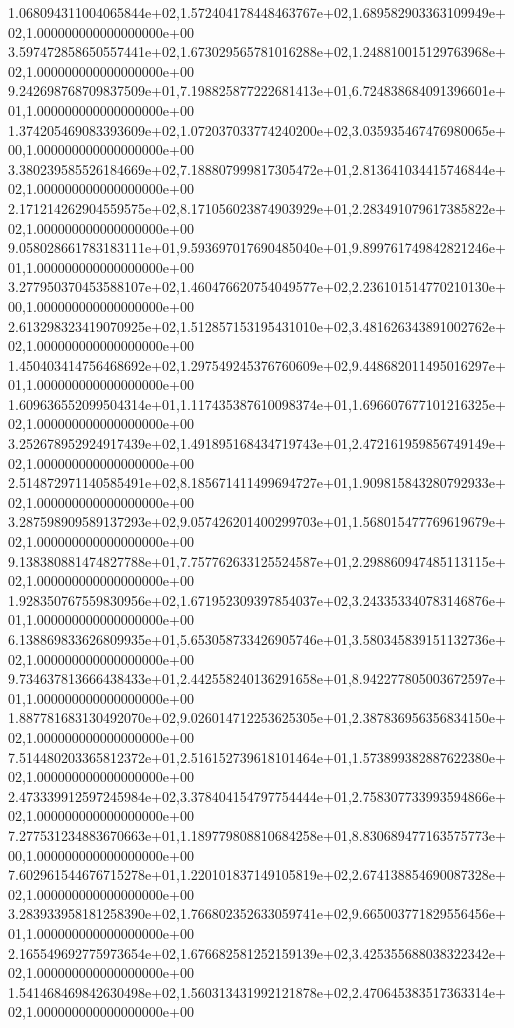 1.068094311004065844e+02,1.572404178448463767e+02,1.689582903363109949e+02,1.000000000000000000e+00
3.597472858650557441e+02,1.673029565781016288e+02,1.248810015129763968e+02,1.000000000000000000e+00
9.242698768709837509e+01,7.198825877222681413e+01,6.724838684091396601e+01,1.000000000000000000e+00
1.374205469083393609e+02,1.072037033774240200e+02,3.035935467476980065e+00,1.000000000000000000e+00
3.380239585526184669e+02,7.188807999817305472e+01,2.813641034415746844e+02,1.000000000000000000e+00
2.171214262904559575e+02,8.171056023874903929e+01,2.283491079617385822e+02,1.000000000000000000e+00
9.058028661783183111e+01,9.593697017690485040e+01,9.899761749842821246e+01,1.000000000000000000e+00
3.277950370453588107e+02,1.460476620754049577e+02,2.236101514770210130e+00,1.000000000000000000e+00
2.613298323419070925e+02,1.512857153195431010e+02,3.481626343891002762e+02,1.000000000000000000e+00
1.450403414756468692e+02,1.297549245376760609e+02,9.448682011495016297e+01,1.000000000000000000e+00
1.609636552099504314e+01,1.117435387610098374e+01,1.696607677101216325e+02,1.000000000000000000e+00
3.252678952924917439e+02,1.491895168434719743e+01,2.472161959856749149e+02,1.000000000000000000e+00
2.514872971140585491e+02,8.185671411499694727e+01,1.909815843280792933e+02,1.000000000000000000e+00
3.287598909589137293e+02,9.057426201400299703e+01,1.568015477769619679e+02,1.000000000000000000e+00
9.138380881474827788e+01,7.757762633125524587e+01,2.298860947485113115e+02,1.000000000000000000e+00
1.928350767559830956e+02,1.671952309397854037e+02,3.243353340783146876e+01,1.000000000000000000e+00
6.138869833626809935e+01,5.653058733426905746e+01,3.580345839151132736e+02,1.000000000000000000e+00
9.734637813666438433e+01,2.442558240136291658e+01,8.942277805003672597e+01,1.000000000000000000e+00
1.887781683130492070e+02,9.026014712253625305e+01,2.387836956356834150e+02,1.000000000000000000e+00
7.514480203365812372e+01,2.516152739618101464e+01,1.573899382887622380e+02,1.000000000000000000e+00
2.473339912597245984e+02,3.378404154797754444e+01,2.758307733993594866e+02,1.000000000000000000e+00
7.277531234883670663e+01,1.189779808810684258e+01,8.830689477163575773e+00,1.000000000000000000e+00
7.602961544676715278e+01,1.220101837149105819e+02,2.674138854690087328e+02,1.000000000000000000e+00
3.283933958181258390e+02,1.766802352633059741e+02,9.665003771829556456e+01,1.000000000000000000e+00
2.165549692775973654e+02,1.676682581252159139e+02,3.425355688038322342e+02,1.000000000000000000e+00
1.541468469842630498e+02,1.560313431992121878e+02,2.470645383517363314e+02,1.000000000000000000e+00
